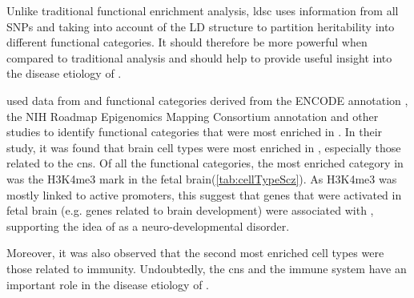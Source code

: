 	Unlike traditional functional enrichment analysis, \gls{ldsc} uses information from all \glspl{SNP} and taking into account of the \gls{LD} structure to partition heritability into different functional categories. 
	It should therefore be more powerful when compared to traditional analysis and should help to provide useful insight into the disease etiology of .

	\citet{Finucane2015} used data from \citet{Ripke2014} and functional categories derived from the ENCODE annotation \citep{ENCODEProjectConsortium2012}, the NIH Roadmap Epigenomics Mapping Consortium annotation \citep{Bernstein2010} and other studies \citep{Finucane2015} to identify functional categories that were most enriched in .
	In their study, it was found that brain cell types were most enriched in , especially those related to the \gls{cns}.
	Of all the functional categories, the most enriched category in  was the H3K4me3 mark in the fetal brain(\cref{tab:cellTypeScz}). 
	As H3K4me3 was mostly linked to active promoters, this suggest that genes that were activated in fetal brain (e.g. genes related to brain development) were associated with , supporting the idea of  as a neuro-developmental disorder. 
	
	Moreover, it was also observed that the second most enriched cell types were those related to immunity.
	Undoubtedly, the \gls{cns} and the immune system have an important role in the disease etiology of . 

